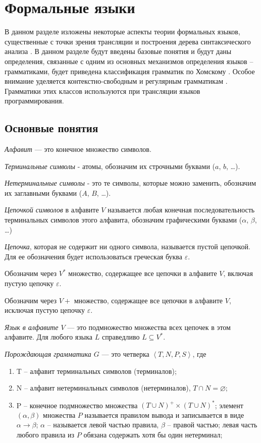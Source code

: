 \section{Формальные языки}

В данном разделе изложены некоторые аспекты теории формальных языков, существенные с точки зрения трансляции и построения дерева синтаксического анализа \cite{bib19}. 
В данном разделе будут введены базовые понятия и будут даны определения, связанные с одним из основных механизмов определения языков -- грамматиками, будет приведена
классификация грамматик по Хомскому \cite{bib20}.
Особое внимание уделяется контекстно-свободным и регулярным грамматикам \cite{bib21}. 
Грамматики этих классов используются при трансляции языков программирования. 

\subsection{Оснонвые понятия}

\textit{Алфавит} — это конечное множество символов.

\textit{Терминальные символы} - атомы, обозначим их строчными буквами ($a$, $b$, \dots).

\textit{Нетерминальные символы} -  это те символы, которые можно заменить, обозначим их заглавными буквами ($A$, $B$, \dots). 

\textit{Цепочкой символов} в алфавите $V$ называется любая конечная последовательность 
терминальных символов этого алфавита, обозначим графическими буквами ($\alpha$, $\beta$, \dots ) 

\textit{Цепочка}, которая не содержит ни одного символа, называется пустой цепочкой. 
Для ее обозначения будет использоваться греческая буква $\varepsilon$.

Обозначим через $V^{*}$ множество, содержащее все цепочки в алфавите
$V$, включая пустую цепочку $\varepsilon$.

Обозначим через $V{+}$ множество, содержащее все цепочки в алфавите $V$,
исключая пустую цепочку $\varepsilon$.

\textit{Язык в алфавите $V$} — это подмножество множества всех цепочек в этом алфавите. 
Для любого языка $L$ справедливо $L \subseteq V^{*}$.


\textit{Порождающая грамматика $G$} — это четверка $\left\langle {T, N, P, S} \right\rangle$, где
\begin{enumerate}
   \item T -- алфавит терминальных символов (терминалов);
   \item N -- алфавит нетерминальных символов (нетерминалов), $T \cap N = \varnothing$;  
   \item P -- конечное подмножество множества $(T \cup N)^{+} \times (T \cup N)^{*}$; 
   элемент $(\alpha, \beta)$ множества $P$ называется правилом вывода и записывается в виде $\alpha \rightarrow \beta$; 
   $\alpha$ -- называется левой частью правила, 
   $\beta$ -- правой частью; левая часть любого правила из $P$ обязана содержать хотя бы один нетерминал; 
\end{enumerate}

